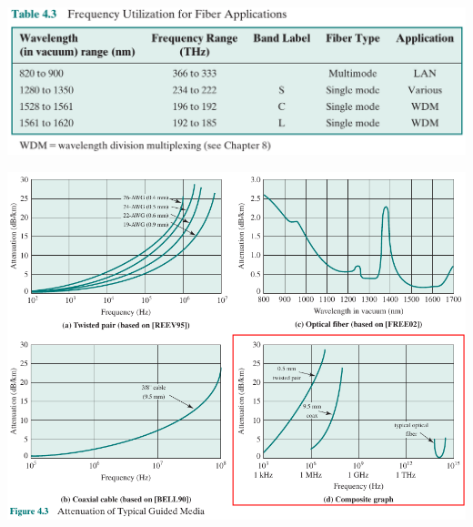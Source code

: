 \documentclass[pdflatex,compress]{beamer}
\begin{document}
\begin{frame}
	\begin{center}
		\includegraphics[width=\linewidth]{img/img16}
	\end{center}
\end{frame}

\begin{frame}
	\begin{center}
		\includegraphics[height=0.9\textheight]{img/img17}
	\end{center}
\end{frame}
\end{document}

